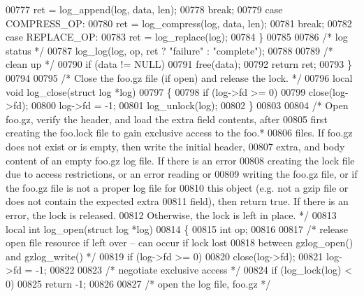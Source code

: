 \begin{DoxyCode}
{00777         ret = log\_append(log, data, len);
00778         \textcolor{keywordflow}{break};
00779     \textcolor{keywordflow}{case} COMPRESS\_OP:
00780         ret = log\_compress(log, data, len);
00781         \textcolor{keywordflow}{break};
00782     \textcolor{keywordflow}{case} REPLACE\_OP:
00783         ret = log\_replace(log);
00784     \}
00785 
00786     \textcolor{comment}{/* log status */}
00787     log\_log(log, op, ret ? \textcolor{stringliteral}{"failure"} : \textcolor{stringliteral}{"complete"});
00788 
00789     \textcolor{comment}{/* clean up */}
00790     \textcolor{keywordflow}{if} (data != NULL)
00791         free(data);
00792     \textcolor{keywordflow}{return} ret;
00793 \}
00794 
00795 \textcolor{comment}{/* Close the foo.gz file (if open) and release the lock. */}
00796 local \textcolor{keywordtype}{void} log\_close(\textcolor{keyword}{struct} log *log)
00797 \{
00798     \textcolor{keywordflow}{if} (log->fd >= 0)
00799         close(log->fd);
00800     log->fd = -1;
00801     log\_unlock(log);
00802 \}
00803 
00804 \textcolor{comment}{/* Open foo.gz, verify the header, and load the extra field contents, after}
00805 \textcolor{comment}{   first creating the foo.lock file to gain exclusive access to the foo.*}
00806 \textcolor{comment}{   files.  If foo.gz does not exist or is empty, then write the initial header,}
00807 \textcolor{comment}{   extra, and body content of an empty foo.gz log file.  If there is an error}
00808 \textcolor{comment}{   creating the lock file due to access restrictions, or an error reading or}
00809 \textcolor{comment}{   writing the foo.gz file, or if the foo.gz file is not a proper log file for}
00810 \textcolor{comment}{   this object (e.g. not a gzip file or does not contain the expected extra}
00811 \textcolor{comment}{   field), then return true.  If there is an error, the lock is released.}
00812 \textcolor{comment}{   Otherwise, the lock is left in place. */}
00813 local \textcolor{keywordtype}{int} log\_open(\textcolor{keyword}{struct} log *log)
00814 \{
00815     \textcolor{keywordtype}{int} op;
00816 
00817     \textcolor{comment}{/* release open file resource if left over -- can occur if lock lost}
00818 \textcolor{comment}{       between gzlog\_open() and gzlog\_write() */}
00819     \textcolor{keywordflow}{if} (log->fd >= 0)
00820         close(log->fd);
00821     log->fd = -1;
00822 
00823     \textcolor{comment}{/* negotiate exclusive access */}
00824     \textcolor{keywordflow}{if} (log\_lock(log) < 0)
00825         \textcolor{keywordflow}{return} -1;
00826 
00827     \textcolor{comment}{/* open the log file, foo.gz */}
}
\end{DoxyCode}
